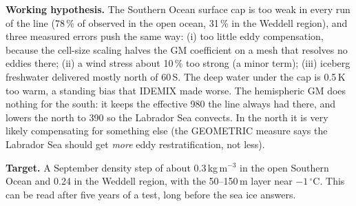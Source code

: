 \documentclass[10pt]{article}
\begin{document}
\textbf{Working hypothesis.} The Southern Ocean surface cap is too weak in every run of the line
(78\,\% of observed in the open ocean, 31\,\% in the Weddell region), and three measured errors push
the same way: (i) too little eddy compensation, because the cell-size scaling halves the GM
coefficient on a mesh that resolves no eddies there; (ii) a wind stress about 10\,\% too strong (a
minor term); (iii)
iceberg freshwater delivered mostly north of 60\,S. The deep water under the cap is 0.5\,K too warm,
a standing bias that IDEMIX made worse. The hemispheric GM does nothing for the south: it keeps the
effective 980 the line always had there, and lowers the north to 390 so the Labrador Sea convects.
In the north it is very likely compensating for something else (the GEOMETRIC measure says the
Labrador Sea should get \emph{more} eddy restratification, not less).

\textbf{Target.} A September density step of about 0.3\,kg\,m$^{-3}$ in the open Southern Ocean and
0.24 in the Weddell region, with the 50--150\,m layer near $-1\,^\circ$C. This can be read after five
years of a test, long before the sea ice answers.
\end{document}
